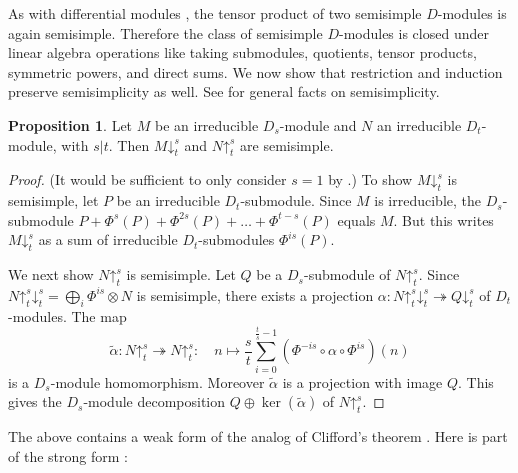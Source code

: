 \documentclass[11pt,reqno]{amsart}
\theoremstyle{definition}
\newtheorem{proposition}[theorem]{Proposition}
\newcommand{\pda}{\mathord{\downarrow}}
\newcommand{\pua}{\mathord{\uparrow}}
\begin{document}
As with differential modules \cite[Exercise 2.38 (4)]{put2003galois}, the tensor product of two semisimple $D$-modules is again semisimple.
Therefore the class of semisimple $D$-modules is closed under linear algebra operations like taking submodules, quotients, tensor products, symmetric powers, and direct sums. 
We now show that restriction and induction preserve semisimplicity as well. 
See \cite[Chapter 17]{lang2012algebra} for general facts on semisimplicity.


\begin{proposition}\label{prop:semisimple}
    Let $M$ be an irreducible $D_s$-module and $N$ an irreducible $D_t$-module, with $s|t$. Then $M\pda^{s}_{t}$ and $N\pua^{s}_{t}$ are semisimple.
\end{proposition}
\begin{proof}
(It would be sufficient to only consider $s=1$ by .)
    To show $M\pda^{s}_{t}$ is semisimple, let $P$ be an irreducible $D_{t}$-submodule.
    Since $M$ is irreducible, the $D_s$-submodule $P+\Phi^s(P)+\Phi^{2s}(P)+\dots+\Phi^{t-s} (P)$ equals $M$. But this writes $M\pda^{s}_{t}$ as a sum of irreducible $D_t$-submodules $\Phi^{is}(P)$.

    We next show $N\pua^{s}_{t}$ is semisimple. Let $Q$ be a $D_s$-submodule of $N\pua^{s}_{t}$. Since $N\pua^{s}_{t}\pda^{s}_{t} = \bigoplus_{i}\Phi^{is}\otimes N$ is semisimple, there exists a projection
    $\alpha\colon N\pua^{s}_{t}\pda^{s}_{t}\twoheadrightarrow Q\pda^{s}_{t}$
    of $D_{t}$-modules.
    The map
    \[
    \tilde{\alpha}\colon N\pua^{s}_{t} \twoheadrightarrow N\pua^{s}_{t}\colon \quad
    n\mapsto \frac{s}{t}\sum_{i=0}^{\frac{t}{s}-1}\left(\Phi^{-is}\circ \alpha \circ \Phi^{is}\right) (n)
    \]
    is a $D_s$-module homomorphism. Moreover $\tilde\alpha$ is a projection with image $Q$. This gives the $D_s$-module decomposition $Q\oplus \ker(\tilde\alpha)$ of $N\pua^{s}_{t}$.
\end{proof}

The above contains a weak form of the  analog of Clifford's theorem \cite[Theorem 23.1]{lassueur2020modular}. Here is part of the strong form \cite[Theorem 23.3]{lassueur2020modular}:
\end{document}
